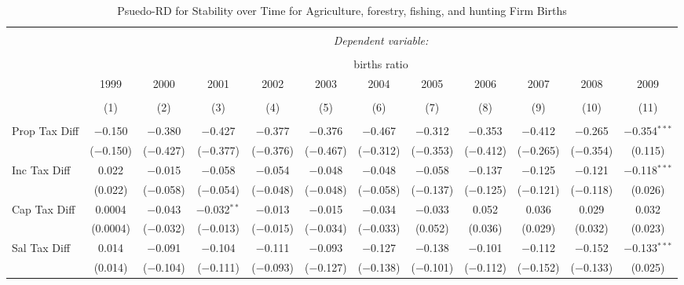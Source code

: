 
\begin{table}[!htbp] \centering 
  \caption{Psuedo-RD for Stability over Time for  Agriculture, forestry, fishing, and hunting Firm Births} 
  \label{11year} 
\small 
\begin{tabular}{@{\extracolsep{5pt}}lccccccccccc} 
\\[-1.8ex]\hline 
\hline \\[-1.8ex] 
 & \multicolumn{11}{c}{\textit{Dependent variable:}} \\ 
\cline{2-12} 
\\[-1.8ex] & \multicolumn{11}{c}{births ratio} \\ 
 & 1999 & 2000 & 2001 & 2002 & 2003 & 2004 & 2005 & 2006 & 2007 & 2008 & 2009 \\ 
\\[-1.8ex] & (1) & (2) & (3) & (4) & (5) & (6) & (7) & (8) & (9) & (10) & (11)\\ 
\hline \\[-1.8ex] 
 Prop Tax Diff & $-$0.150 & $-$0.380 & $-$0.427 & $-$0.377 & $-$0.376 & $-$0.467 & $-$0.312 & $-$0.353 & $-$0.412 & $-$0.265 & $-$0.354$^{***}$ \\ 
  & ($-$0.150) & ($-$0.427) & ($-$0.377) & ($-$0.376) & ($-$0.467) & ($-$0.312) & ($-$0.353) & ($-$0.412) & ($-$0.265) & ($-$0.354) & (0.115) \\ 
  Inc Tax Diff & 0.022 & $-$0.015 & $-$0.058 & $-$0.054 & $-$0.048 & $-$0.048 & $-$0.058 & $-$0.137 & $-$0.125 & $-$0.121 & $-$0.118$^{***}$ \\ 
  & (0.022) & ($-$0.058) & ($-$0.054) & ($-$0.048) & ($-$0.048) & ($-$0.058) & ($-$0.137) & ($-$0.125) & ($-$0.121) & ($-$0.118) & (0.026) \\ 
  Cap Tax Diff & 0.0004 & $-$0.043 & $-$0.032$^{**}$ & $-$0.013 & $-$0.015 & $-$0.034 & $-$0.033 & 0.052 & 0.036 & 0.029 & 0.032 \\ 
  & (0.0004) & ($-$0.032) & ($-$0.013) & ($-$0.015) & ($-$0.034) & ($-$0.033) & (0.052) & (0.036) & (0.029) & (0.032) & (0.023) \\ 
  Sal Tax Diff & 0.014 & $-$0.091 & $-$0.104 & $-$0.111 & $-$0.093 & $-$0.127 & $-$0.138 & $-$0.101 & $-$0.112 & $-$0.152 & $-$0.133$^{***}$ \\ 
  & (0.014) & ($-$0.104) & ($-$0.111) & ($-$0.093) & ($-$0.127) & ($-$0.138) & ($-$0.101) & ($-$0.112) & ($-$0.152) & ($-$0.133) & (0.025) \\ 

\end{tabular}
\end{table}
